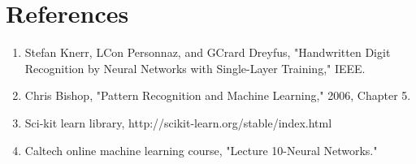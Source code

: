 \documentclass[11pt,letterpaper]{article}
\begin{document}
\section{References}

\begin{enumerate}
\item Stefan Knerr, LCon Personnaz, and GCrard Dreyfus, "Handwritten Digit Recognition by Neural Networks with Single-Layer Training," IEEE.
\item Chris Bishop, "Pattern Recognition and Machine Learning," 2006, Chapter 5.
\item Sci-kit learn library, http://scikit-learn.org/stable/index.html
\item Caltech online machine learning course, "Lecture 10-Neural Networks."
\end{enumerate}






\end{document}
